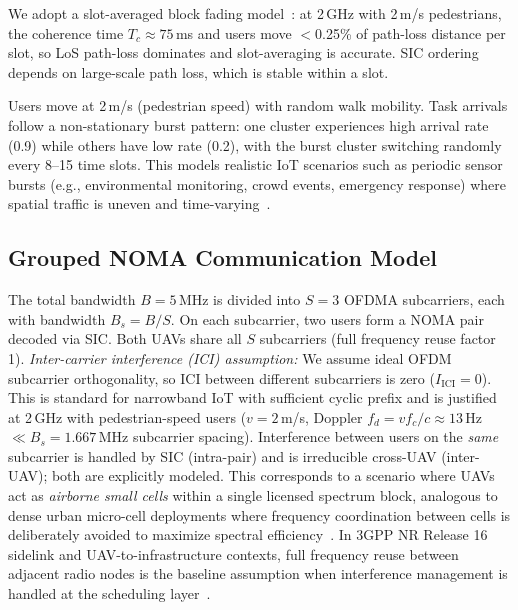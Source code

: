 \documentclass[journal]{IEEEtran}
\begin{document}
We adopt a slot-averaged block fading model~\cite{alhourani2014optimal,mao2017survey}: at 2\,GHz with 2\,m/s pedestrians, the coherence time $T_c \approx 75$\,ms and users move $<$0.25\% of path-loss distance per slot, so LoS path-loss dominates and slot-averaging is accurate.
SIC ordering depends on large-scale path loss, which is stable within a slot.

Users move at 2\,m/s (pedestrian speed) with random walk mobility.
Task arrivals follow a non-stationary burst pattern: one cluster experiences high arrival rate (0.9) while others have low rate (0.2), with the burst cluster switching randomly every 8--15 time slots.
This models realistic IoT scenarios such as periodic sensor bursts (e.g., environmental monitoring, crowd events, emergency response) where spatial traffic is uneven and time-varying~\cite{mao2017survey}.

\subsection{Grouped NOMA Communication Model}

The total bandwidth $B = 5$\,MHz is divided into $S = 3$ OFDMA subcarriers, each with bandwidth $B_s = B/S$.
On each subcarrier, two users form a NOMA pair decoded via SIC.
Both UAVs share all $S$ subcarriers (full frequency reuse factor 1).
\emph{Inter-carrier interference (ICI) assumption:} We assume ideal OFDM subcarrier orthogonality, so ICI between different subcarriers is zero ($I_{\text{ICI}} = 0$). This is standard for narrowband IoT with sufficient cyclic prefix and is justified at 2\,GHz with pedestrian-speed users ($v = 2$\,m/s, Doppler $f_d = v f_c/c \approx 13$\,Hz $\ll B_s = 1.667$\,MHz subcarrier spacing). Interference between users on the \emph{same} subcarrier is handled by SIC (intra-pair) and is irreducible cross-UAV (inter-UAV); both are explicitly modeled.
This corresponds to a scenario where UAVs act as \emph{airborne small cells} within a single licensed spectrum block, analogous to dense urban micro-cell deployments where frequency coordination between cells is deliberately avoided to maximize spectral efficiency~\cite{shin2017non}.
In 3GPP NR Release 16 sidelink and UAV-to-infrastructure contexts, full frequency reuse between adjacent radio nodes is the baseline assumption when interference management is handled at the scheduling layer~\cite{saito2013non}.
\end{document}
